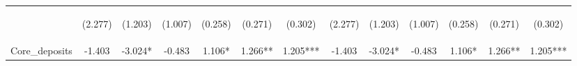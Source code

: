 \documentclass[]{article}
\begin{document}
\begin{center}
\begin{tabular}{lcccccccccccc}
\vspace{4pt} & \begin{footnotesize}(2.277)\end{footnotesize} & \begin{footnotesize}(1.203)\end{footnotesize} & \begin{footnotesize}(1.007)\end{footnotesize} & \begin{footnotesize}(0.258)\end{footnotesize} & \begin{footnotesize}(0.271)\end{footnotesize} & \begin{footnotesize}(0.302)\end{footnotesize} & \begin{footnotesize}(2.277)\end{footnotesize} & \begin{footnotesize}(1.203)\end{footnotesize} & \begin{footnotesize}(1.007)\end{footnotesize} & \begin{footnotesize}(0.258)\end{footnotesize} & \begin{footnotesize}(0.271)\end{footnotesize} & \begin{footnotesize}(0.302)\end{footnotesize} \\
Core\_deposits & -1.403 & -3.024* & -0.483 & 1.106* & 1.266** & 1.205*** & -1.403 & -3.024* & -0.483 & 1.106* & 1.266** & 1.205*** \\

\end{tabular}
\end{center}
\end{document}
